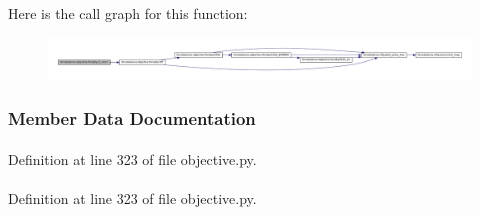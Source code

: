\-Here is the call graph for this function\-:\nopagebreak
\begin{figure}[H]
\begin{center}
\leavevmode
\includegraphics[width=350pt]{classforcebalance_1_1objective_1_1Penalty_ab59d5beafbab0918b7c3e0c61ece41a3_cgraph}
\end{center}
\end{figure}




\subsubsection{\-Member \-Data \-Documentation}
\hypertarget{classforcebalance_1_1objective_1_1Penalty_a27d10ae4d7dc4691170456ca7c2208c7}{
\paragraph[{a}]{}}\label{classforcebalance_1_1objective_1_1Penalty_a27d10ae4d7dc4691170456ca7c2208c7}


\-Definition at line 323 of file objective.\-py.

\hypertarget{classforcebalance_1_1objective_1_1Penalty_a90c9d0618d160aac6d2b30643087eb1c}{
\paragraph[{b}]{}}\label{classforcebalance_1_1objective_1_1Penalty_a90c9d0618d160aac6d2b30643087eb1c}


\-Definition at line 323 of file objective.\-py.

\hypertarget{classforcebalance_1_1objective_1_1Penalty_a29f26a2c093d2bff5514e246130d6a53}{
\paragraph[{fadd}]{}}\label{classforcebalance_1_1objective_1_1Penalty_a29f26a2c093d2bff5514e246130d6a53}


